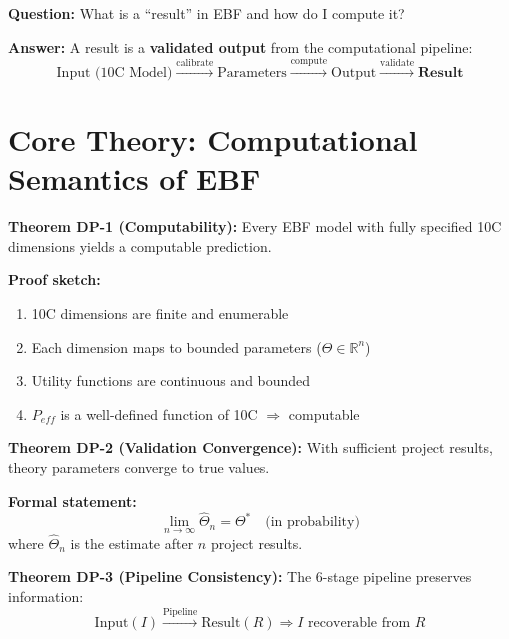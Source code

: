 \begin{tcolorbox}[colback=red!5!white, colframe=red!75!black,
    title=\textbf{The Fundamental Question}]

\textbf{Question:} What is a ``result'' in EBF and how do I compute it?

\textbf{Answer:} A result is a \textbf{validated output} from the computational pipeline:
\begin{equation}
\text{Input (10C Model)} \xrightarrow{\text{calibrate}} \text{Parameters} \xrightarrow{\text{compute}} \text{Output} \xrightarrow{\text{validate}} \textbf{Result}
\end{equation}

\end{tcolorbox}

\section{Core Theory: Computational Semantics of EBF}
\label{sec:dp-theory}

\begin{tcolorbox}[colback=blue!3!white, colframe=blue!60!black,
    title=\textbf{Theoretical Foundation: What Makes EBF Computable?}]

\textbf{Theorem DP-1 (Computability):}
Every EBF model with fully specified 10C dimensions yields a computable prediction.

\textbf{Proof sketch:}
\begin{enumerate}[nosep]
    \item 10C dimensions are finite and enumerable
    \item Each dimension maps to bounded parameters ($\Theta \in \mathbb{R}^n$)
    \item Utility functions are continuous and bounded
    \item $P_{eff}$ is a well-defined function of 10C $\Rightarrow$ computable
\end{enumerate}

\textbf{Theorem DP-2 (Validation Convergence):}
With sufficient project results, theory parameters converge to true values.

\textbf{Formal statement:}
\begin{equation}
\lim_{n \rightarrow \infty} \hat{\Theta}_n = \Theta^* \quad \text{(in probability)}
\end{equation}
where $\hat{\Theta}_n$ is the estimate after $n$ project results.

\textbf{Theorem DP-3 (Pipeline Consistency):}
The 6-stage pipeline preserves information:
\begin{equation}
\text{Input}(I) \xrightarrow{\text{Pipeline}} \text{Result}(R) \Rightarrow I \text{ recoverable from } R
\end{equation}

\end{tcolorbox}


